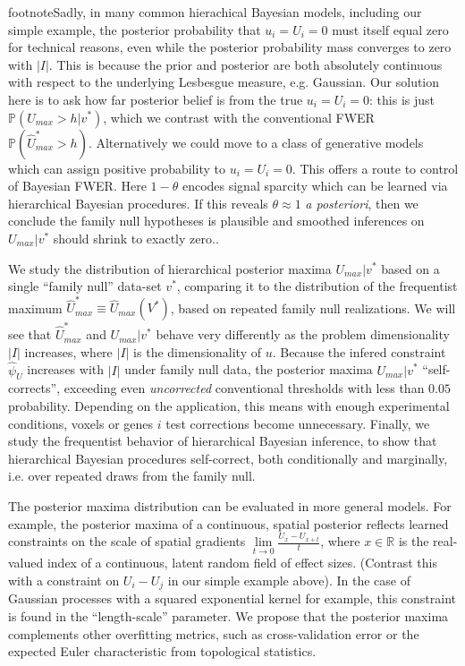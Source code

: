\documentclass{article}
\begin{document}
footnote{Sadly, in many common hierachical Bayesian models, including our simple example, the posterior probability that $u_i=U_i=0$ must itself equal zero for technical reasons, even while the posterior probability mass converges to zero with $|I|$. This is because the prior and posterior are both absolutely continuous with respect to the underlying Lesbesgue measure, e.g. Gaussian. Our solution here is to ask how far posterior belief is from the true $u_i=U_i=0$: this is just $\mathbb{P}(U_{max}>h|v^*)$, which we contrast with the conventional FWER $\mathbb{P}(\hat{U}_{max}^*>h)$. Alternatively we could move to a class of generative models which can assign positive probability to $u_i=U_i=0$. This offers a route to control of Bayesian FWER. Here $1-\theta$ encodes signal sparcity which can be learned via hierarchical Bayesian procedures. If this reveals $\theta \approx 1$ \textit{a posteriori}, then we conclude the family null hypotheses is plausible and smoothed inferences on $U_{max}|v^*$ should shrink to exactly zero.}. 

We study the distribution of hierarchical posterior maxima $U_{max}|v^*$ based on a single ``family null'' data-set $v^*$, comparing it to the distribution of the frequentist maximum $\hat{U}_{max}^* \equiv \hat{U}_{max}(V^*)$, based on repeated family null realizations. We will see that $\hat{U}_{max}^*$ and $U_{max}|v^*$ behave very differently as the problem dimensionality $|I|$ increases, where $|I|$ is the dimensionality of $u$. Because the infered constraint $\hat{\psi}_U$ increases with $|I|$ under family null data, the posterior maxima $U_{max}|v^*$ ``self-corrects'', exceeding even \textit{uncorrected} conventional thresholds with less than $0.05$ probability. Depending on the application, this means with enough experimental conditions, voxels or genes $i$ test corrections become unnecessary. Finally, we study the frequentist behavior of hierarchical Bayesian inference, to show that hierarchical Bayesian procedures self-correct, both conditionally and marginally, i.e. over repeated draws from the family null. 

The posterior maxima distribution can be evaluated in more general models. For example, the posterior maxima of a continuous, spatial posterior reflects learned constraints on the scale of spatial gradients $\lim\limits_{t \to 0} \frac{U_x-U_{x+t}}{t}$, where $x \in \mathbb{R}$ is the real-valued index of a continuous, latent random field of effect sizes. (Contrast this with a constraint on $U_i-U_j$ in our simple example above). In the case of Gaussian processes with a squared exponential kernel for example, this constraint is found in the ``length-scale'' parameter. We propose that the posterior maxima complements other overfitting metrics, such as cross-validation error or the expected Euler characteristic from topological statistics. 
\end{document}
